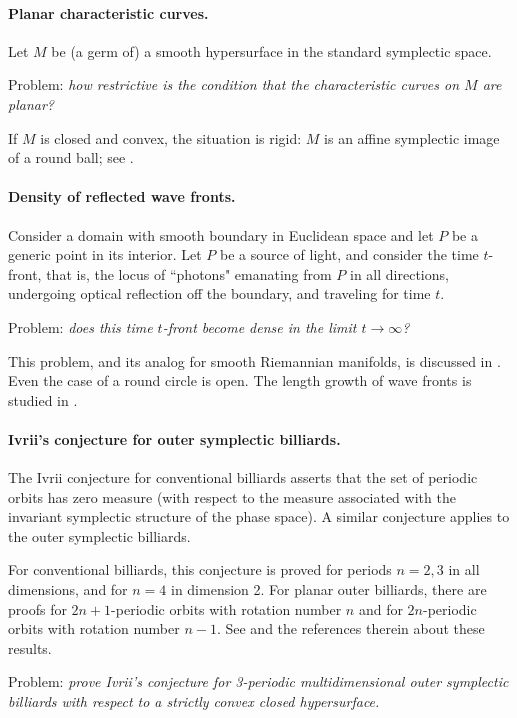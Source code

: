 \documentclass[11pt]{article}
\theoremstyle{definition}
\begin{document}
\paragraph{Planar characteristic curves.} Let $M$ be (a germ of) a smooth hypersurface in the standard symplectic space. 

Problem: {\it how restrictive is the condition that the characteristic curves on $M$ are planar?}

If $M$ is closed and convex, the situation is rigid: $M$ is an affine symplectic image of a round ball; see \cite{KS}.

\paragraph{Density of reflected wave fronts.} Consider a domain with smooth boundary in Euclidean space and let $P$ be a generic point in its interior. Let $P$ be a source of light, and consider the time $t$-front, that is, the locus of ``photons" emanating from $P$ in all directions, undergoing optical reflection off the boundary, and traveling for time $t$. 

Problem: {\it does this time $t$-front become dense in the limit $t \to \infty$?} 

This problem, and its analog for smooth Riemannian manifolds, is discussed in \cite{KK}. Even the case of a round circle is open. The length growth of wave fronts is studied in \cite{dV,dV2}.

\paragraph{Ivrii's conjecture for outer symplectic billiards.} The Ivrii conjecture for conventional billiards asserts that the set of periodic orbits has zero measure (with respect to the measure associated with the invariant symplectic structure of the phase space). A similar conjecture applies to the outer symplectic billiards.

For conventional billiards, this conjecture is proved for periods $n=2,3$ in all dimensions, and for $n=4$ in dimension 2.
For planar outer billiards, there are proofs for $2n+1$-periodic orbits with rotation number $n$ and for $2n$-periodic orbits with rotation number $n-1$.  See \cite{Sh} and the references therein about these results.

Problem: {\it prove Ivrii's conjecture for 3-periodic multidimensional outer symplectic billiards with respect to a strictly convex closed hypersurface.}
\end{document}
